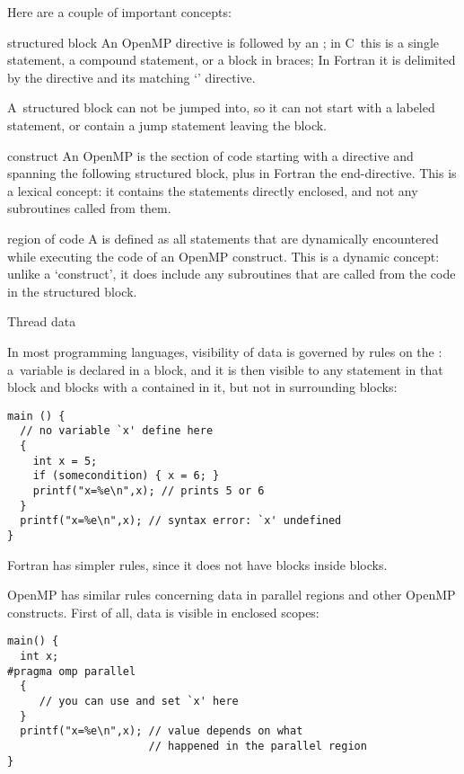 Here are a couple of important concepts:
\begin{definition}
\item[structured block] An OpenMP directive is followed by an
  ; in C~this is a single statement, a
  compound statement, or a block in braces; In Fortran it is
  delimited by the directive and its matching `' directive.

  A~structured block can not be jumped into, so it can not start with a
  labeled statement, or contain a jump statement leaving the block.
\item[construct] An OpenMP  is the section of code
  starting with a directive and spanning the following structured block,
  plus in Fortran the end-directive. This is a lexical concept: it contains
  the statements directly enclosed, and not any subroutines called from them.
\item[region of code] A  is defined as all statements
  that are dynamically encountered while executing the code of an OpenMP construct.
  This is a dynamic concept: unlike a `construct', it does include any subroutines
  that are called from the code in the structured block.
\end{definition}

 {Thread data}

In most programming languages, visibility of data
is governed by rules on the :
a~variable is declared in a block, and it is then visible to any
statement in that block and blocks with a 
contained in it, but not in surrounding blocks:
\begin{verbatim}
main () {
  // no variable `x' define here
  {
    int x = 5;
    if (somecondition) { x = 6; }
    printf("x=%e\n",x); // prints 5 or 6
  }
  printf("x=%e\n",x); // syntax error: `x' undefined
}
\end{verbatim}
Fortran has simpler rules, since it does not have blocks inside blocks.

OpenMP has similar rules concerning data in parallel regions
and other OpenMP constructs. First of all, data is visible
in enclosed scopes:
\begin{verbatim}
main() {
  int x;
#pragma omp parallel
  {
     // you can use and set `x' here
  }
  printf("x=%e\n",x); // value depends on what
                      // happened in the parallel region
}
\end{verbatim}

